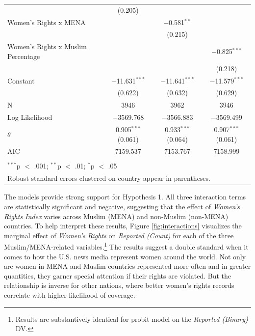 \documentclass[11pt, oneside]{article}
\begin{document}
\begin{table}[!htbp]
\begin{tabular}{@{\extracolsep{5pt}}lccc}
  & (0.205) &  &  \\ 
  Women's Rights x MENA &  & $-$0.581$^{**}$ &  \\ 
  &  & (0.215) &  \\ 
  Women's Rights x Muslim Percentage &  &  & $-$0.825$^{***}$ \\ 
  &  &  & (0.218) \\ 
  Constant & $-$11.631$^{***}$ & $-$11.641$^{***}$ & $-$11.579$^{***}$ \\ 
  & (0.622) & (0.632) & (0.629) \\ 
 N & 3946 & 3962 & 3946 \\ 
Log Likelihood & $-$3569.768 & $-$3566.883 & $-$3569.499 \\ 
$\theta$ & 0.905$^{***}$  (0.061) & 0.933$^{***}$  (0.064) & 0.907$^{***}$  (0.061) \\ 
AIC & 7159.537 & 7153.767 & 7158.999 \\ 
\hline \\[-1.8ex] 
\multicolumn{4}{l}{$^{***}$p $<$ .001; $^{**}$p $<$ .01; $^{*}$p $<$ .05} \\ 
\multicolumn{4}{l}{Robust standard errors clustered on country appear in parentheses.} \\ 
\end{tabular} 
\end{table} 

The models provide strong support for Hypothesis 1. All three interaction terms are statistically significant and negative, suggesting that the effect of \emph{Women's Rights Index} varies across Muslim (MENA) and non-Muslim (non-MENA) countries. To help interpret these results, Figure \ref{fig:interactions} visualizes the marginal effect of \emph{Women's Rights} on \emph{Reported (Count)} for each of the three Muslim/MENA-related variables.\footnote{Results are substantively identical for probit model on the \emph{Reported (Binary)} DV.} The results suggest a double standard when it comes to how the U.S. news media represent women around the world. Not only are women in MENA and Muslim countries represented more often and in greater quantities, they garner special attention if their rights are violated. But the relationship is inverse for other nations, where better women's rights records correlate with higher likelihood of coverage. 
\end{document}
